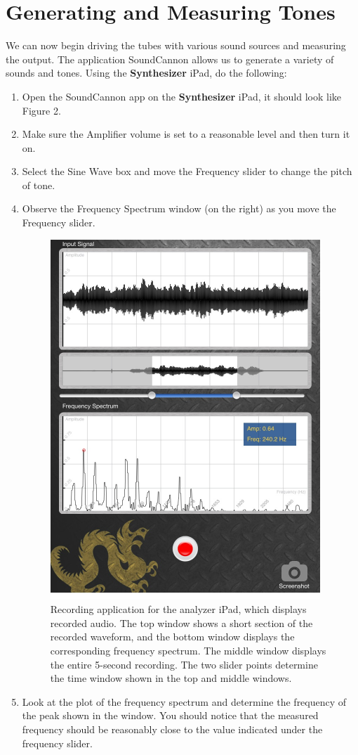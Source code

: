 \documentclass[12pt]{article}
\begin{document}
\section{Generating and Measuring Tones} 
We can now begin driving the tubes with various sound sources and measuring the output. The application SoundCannon allows us to generate a variety of sounds and tones. Using the \textbf{Synthesizer} iPad, do the following:

\begin{enumerate} 
\item Open the SoundCannon app on the \textbf{Synthesizer} iPad, it should look like Figure 2.
\item Make sure the Amplifier volume is set to a reasonable level and then turn it on.
\item Select the Sine Wave box and move the Frequency slider to change the pitch of tone.
\item Observe the Frequency Spectrum window (on the right) as you move the Frequency slider.

\begin{figure}[!h]
\centering
\includegraphics[width=4in]{images/Screenshots/SoundAnalysisApp}
\caption{Recording application for the analyzer iPad, which displays recorded audio. The top window shows a short section of the recorded waveform, and the bottom window displays the corresponding frequency spectrum. The middle window displays the entire 5-second recording. The two slider points determine the time window shown in the top and middle windows.}
\label{analyzerProgram}
\end{figure}

\item Look at the plot of the frequency spectrum and determine the frequency of the peak shown in the window. You should notice that the measured frequency should be reasonably close to the value indicated under the frequency slider.
\end{enumerate}
\end{document}
